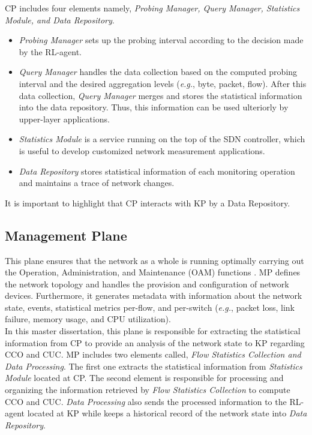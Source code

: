 CP includes four elements namely, \textit{Probing Manager, Query Manager, Statistics Module, and Data Repository}. 

\begin{itemize}
    \item \textit{Probing Manager} sets up the probing interval according to the decision made by the RL-agent.
    \item  \textit{Query Manager} handles the data collection based on the computed probing interval and the desired aggregation levels (\textit{e.g.}, byte, packet, flow). After this data collection, \textit{Query Manager} merges and stores the statistical information into the data repository. Thus, this information can be used ulteriorly by upper-layer applications.
    \item \textit{Statistics Module} is a service running on the top of the SDN controller, which is useful to develop customized network measurement applications.
    \item \textit{Data Repository} stores statistical information of each monitoring operation and maintains a trace of network changes.
\end{itemize}{}

It is important to highlight that CP interacts with KP by a Data Repository.

\subsection{Management Plane}
This plane ensures that the network as a whole is running optimally carrying out the Operation, Administration, and Maintenance (OAM) functions \cite{wickboldt_2015:management_requeriments,denazis_2015:layer_architecture}. MP defines the network topology and handles the provision and configuration of network devices. Furthermore, it generates metadata with information about the network state, events, statistical metrics per-flow, and per-switch (\textit{e.g.}, packet loss, link failure, memory usage, and CPU utilization). \\

In this master dissertation, this plane is responsible for extracting the statistical information from CP to provide an analysis of the network state to KP regarding CCO and CUC. MP includes two elements called, \textit{Flow Statistics Collection and Data Processing}. The first one extracts the statistical information from \textit{Statistics Module} located at CP. The second element is responsible for processing and organizing the information retrieved by \textit{Flow Statistics Collection} to compute CCO and CUC. \textit{Data Processing} also sends the processed information to the RL-agent located at KP while keeps a historical record of the network state into \textit{Data Repository}.\\

